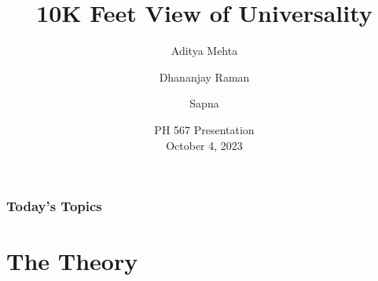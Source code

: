 \documentclass[
	11pt, %
	aspectratio=169, %
]{beamer}
\title[Universality]{10K Feet View of Universality} %
\author[Aditya \and Dhano \and Sapna]{Aditya Mehta \and Dhananjay Raman \and Sapna} %
\institute[IITB]{Indian Institute of Technology, Bombay} %
\date[October 4, 2023]{PH 567 Presentation \\ October 4, 2023} %
\begin{document}

\begin{frame}
	\titlepage %
\end{frame}



\begin{frame}
	\frametitle{Today's Topics} %
	
	\tableofcontents %
\end{frame}


\section{The Theory} %
\end{document}
